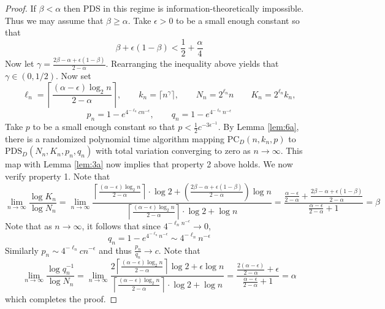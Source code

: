 \begin{proof}
If $\beta < \alpha$ then PDS in this regime is information-theoretically impossible. Thus we may assume that $\beta \ge \alpha$. Take $\epsilon > 0$ to be a small enough constant so that
$$\beta + \epsilon(1 - \beta) < \frac{1}{2} + \frac{\alpha}{4}$$
Now let $\gamma = \frac{2\beta - \alpha + \epsilon(1 - \beta)}{2 - \alpha}$. Rearranging the inequality above yields that $\gamma \in (0, 1/2)$. Now set
$$\ell_n = \left\lceil \frac{(\alpha - \epsilon) \log_2 n}{2 - \alpha} \right\rceil, \quad \quad k_n = \lceil n^{\gamma} \rceil, \quad \quad N_n = 2^{\ell_n} n \quad \quad K_n = 2^{\ell_n} k_n,$$
$$p_n = 1 - e^{4^{-\ell_n} cn^{-\epsilon}}, \quad \quad q_n = 1 - e^{4^{-\ell_n} n^{-\epsilon}}$$
Take $p$ to be a small enough constant so that $p < \frac{1}{2} c^{-3\epsilon^{-1}}$. By Lemma \ref{lem:6a}, there is a randomized polynomial time algorithm mapping $\text{PC}_D(n, k_n, p)$ to $\text{PDS}_D(N_n, K_n, p_n, q_n)$ with total variation converging to zero as $n \to \infty$. This map with Lemma \ref{lem:3a} now implies that property 2 above holds. We now verify property 1. Note that
$$\lim_{n \to \infty} \frac{\log K_n}{\log N_n} = \lim_{n \to \infty} \frac{\left\lceil \frac{(\alpha - \epsilon) \log_2 n}{2 - \alpha} \right\rceil \cdot \log 2 + \left( \frac{2\beta - \alpha + \epsilon(1 - \beta)}{2 - \alpha} \right) \log n}{\left\lceil \frac{(\alpha - \epsilon) \log_2 n}{2 - \alpha} \right\rceil\cdot \log 2 + \log n} = \frac{\frac{\alpha - \epsilon}{2 - \alpha} + \frac{2\beta - \alpha + \epsilon(1 - \beta)}{2 - \alpha}}{\frac{\alpha - \epsilon}{2 - \alpha} + 1} = \beta$$
Note that as $n \to \infty$, it follows that since $4^{-\ell_n n^{-\epsilon}} \to 0$,
$$q_n = 1 - e^{4^{-\ell_n} n^{-\epsilon}} \sim 4^{-\ell_n} n^{-\epsilon}$$
Similarly $p_n \sim 4^{-\ell_n} c n^{-\epsilon}$ and thus $\frac{p_n}{q_n} \to c$. Note that
$$\lim_{n \to \infty} \frac{\log q_n^{-1}}{\log N_n} = \lim_{n \to \infty} \frac{2\left\lceil \frac{(\alpha - \epsilon) \log_2 n}{2 - \alpha} \right\rceil \log 2 + \epsilon \log n}{\left\lceil \frac{(\alpha - \epsilon) \log_2 n}{2 - \alpha} \right\rceil\cdot \log 2 + \log n} = \frac{\frac{2(\alpha - \epsilon)}{2 - \alpha} + \epsilon}{\frac{\alpha - \epsilon}{2 - \alpha} + 1} = \alpha$$
which completes the proof.
\end{proof}

